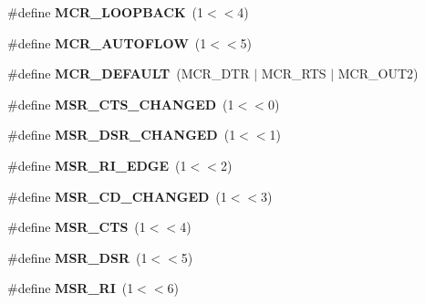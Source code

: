 \begin{DoxyCompactItemize}
\item 
\mbox{\label{group__hal__dos_ga95592ff726b61e0780b0d4c7c7c26fcb}} 
\#define {\bfseries M\+C\+R\+\_\+\+L\+O\+O\+P\+B\+A\+CK}~(1$<$$<$4)
\item 
\mbox{\label{group__hal__dos_gadaf99d8ba6dea7d12c2551f9ba0d000a}} 
\#define {\bfseries M\+C\+R\+\_\+\+A\+U\+T\+O\+F\+L\+OW}~(1$<$$<$5)
\item 
\mbox{\label{group__hal__dos_ga3041367c1e3b71ea438e88b68d90d725}} 
\#define {\bfseries M\+C\+R\+\_\+\+D\+E\+F\+A\+U\+LT}~(M\+C\+R\+\_\+\+D\+TR $\vert$ M\+C\+R\+\_\+\+R\+TS $\vert$ M\+C\+R\+\_\+\+O\+U\+T2)
\item 
\mbox{\label{group__hal__dos_gaf5024a0b85987ce1b19e46609a4023c6}} 
\#define {\bfseries M\+S\+R\+\_\+\+C\+T\+S\+\_\+\+C\+H\+A\+N\+G\+ED}~(1$<$$<$0)
\item 
\mbox{\label{group__hal__dos_ga856f1438337659d52d03fee4e37675e9}} 
\#define {\bfseries M\+S\+R\+\_\+\+D\+S\+R\+\_\+\+C\+H\+A\+N\+G\+ED}~(1$<$$<$1)
\item 
\mbox{\label{group__hal__dos_ga89a8c65c6f184a528b8efc3762ed7ea8}} 
\#define {\bfseries M\+S\+R\+\_\+\+R\+I\+\_\+\+E\+D\+GE}~(1$<$$<$2)
\item 
\mbox{\label{group__hal__dos_gacaf7caab8fffc95e513e9e65cef46c97}} 
\#define {\bfseries M\+S\+R\+\_\+\+C\+D\+\_\+\+C\+H\+A\+N\+G\+ED}~(1$<$$<$3)
\item 
\mbox{\label{group__hal__dos_ga99bfd5dadd350f9bd1901282bc88bc35}} 
\#define {\bfseries M\+S\+R\+\_\+\+C\+TS}~(1$<$$<$4)
\item 
\mbox{\label{group__hal__dos_gabefbb7ce73e57a43abd7351c33dd81dd}} 
\#define {\bfseries M\+S\+R\+\_\+\+D\+SR}~(1$<$$<$5)
\item 
\mbox{\label{group__hal__dos_ga0960208e3de952801488883144eae96b}} 
\#define {\bfseries M\+S\+R\+\_\+\+RI}~(1$<$$<$6)
\item 
\mbox{\label{group__hal__dos_gac94b8604b9ebea796f84bfa89cf79a01}} 
$$
\end{DoxyCompactItemize}
